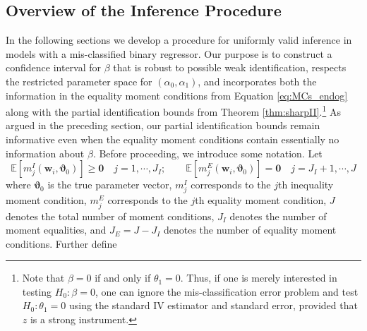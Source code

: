 \subsection{Overview of the Inference Procedure}
\label{sec:overview}
In the following sections we develop a procedure for uniformly valid inference in models with a mis-classified binary regressor.
Our purpose is to construct a confidence interval for $\beta$ that is robust to possible weak identification, respects the restricted parameter space for $(\alpha_0, \alpha_1)$, and incorporates both the information in the equality moment conditions from Equation \ref{eq:MCs_endog} along with the partial identification bounds from Theorem \ref{thm:sharpII}.\footnote{Note that $\beta=0$ if and only if $\theta_1 = 0$. Thus, if one is merely interested in testing $H_0\colon \beta=0$, one can ignore the mis-classification error problem and test $H_0\colon \theta_1 = 0$ using the standard IV estimator and standard error, provided that $z$ is a strong instrument.}
As argued in the preceding section, our partial identification bounds remain informative even when the equality moment conditions contain essentially no information about $\beta$.
Before proceeding, we introduce some notation.
Let
\begin{equation}
  \mathbb{E} \left[ m^I_j(\mathbf{w}_i,\boldsymbol{\vartheta}_0) \right]
  \geq \mathbf{0} \quad j = 1, \cdots, J_I; \quad \quad
 \mathbb{E} \left[ m^E_j(\mathbf{w}_i,\boldsymbol{\vartheta}_0) \right]
 = \mathbf{0} \quad  j = J_I + 1, \cdots,J  
   \label{eq:mdefs}
 \end{equation}
 where $\boldsymbol{\vartheta}_0$ is the true parameter vector, $m_j^I$ corresponds to the $j$th inequality moment condition, $m_j^E$ corresponds to the $j$th equality moment condition, $J$ denotes the total number of moment conditions, $J_I$ denotes the number of moment equalities, and $J_E = J - J_I$ denotes the number of equality moment conditions.
Further define 
